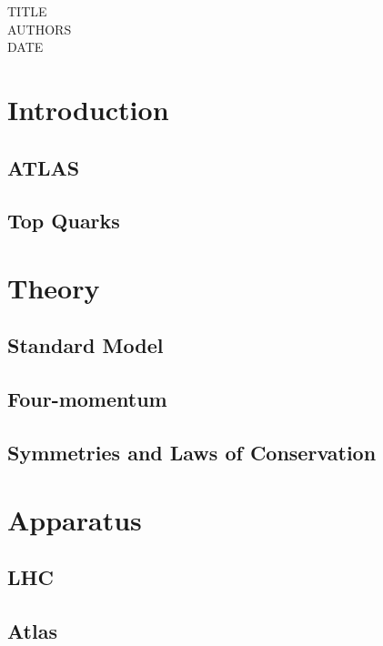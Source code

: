 \documentclass[11pt,a4paper]{article}
\begin{document}
TITLE\\
AUTHORS\\
DATE

\cleardoublepage{}
\begin{abstract}
  
\end{abstract}
\cleardoublepage{}
\tableofcontents{}
\section{Introduction}

\subsection{ATLAS}

\subsection{Top Quarks}

\section{Theory}

\subsection{Standard Model}

\subsection{Four-momentum}

\subsection{Symmetries and Laws of Conservation}

\section{Apparatus}

\subsection{LHC}

\subsection{Atlas}
\end{document}
